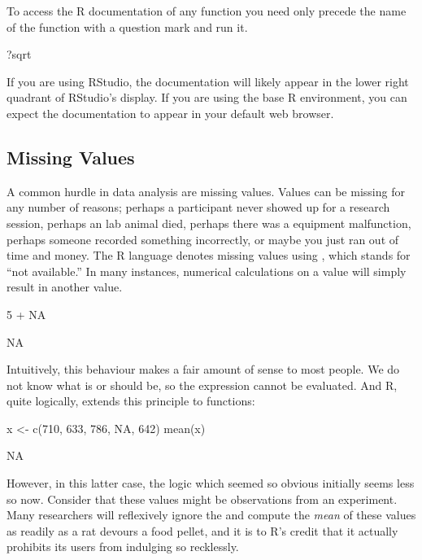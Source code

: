 To access the R documentation of any function you need only precede the name of the function with a question mark and run it.

\begin{inR}
?sqrt
\end{inR}

\vspace{1em}

\noindent If you are using RStudio, the documentation will likely appear in the lower right quadrant of RStudio's display. If you are using the base R environment, you can expect the documentation to appear in your default web browser.

\subsection{Missing Values}

A common hurdle in data analysis are missing values.  Values can be missing for any number of reasons; perhaps a participant never showed up for a research session, perhaps an lab animal died, perhaps there was a equipment malfunction, perhaps someone recorded something incorrectly, or maybe you just ran out of time and money. The R language denotes missing values using , which stands for ``not available.'' In many instances, numerical calculations on a  value will simply result in another  value.

\begin{inR}
5 + NA
\end{inR}
\begin{outR}
[1] NA
\end{outR}

Intuitively, this behaviour makes a fair amount of sense to most people.  We do not know what  is or should be, so the expression  cannot be evaluated. And R, quite logically, extends this principle to functions:

\begin{inR}
x <- c(710, 633, 786, NA, 642)
mean(x)
\end{inR}
\begin{outR}
[1] NA
\end{outR}

However, in this latter case, the logic which seemed so obvious initially seems less so now.  Consider that these values might be observations from an experiment.  Many researchers will reflexively ignore the  and compute the \textit{mean} of these values as readily as a rat devours a food pellet, and it is to R's credit that it actually prohibits its users from indulging so recklessly.

